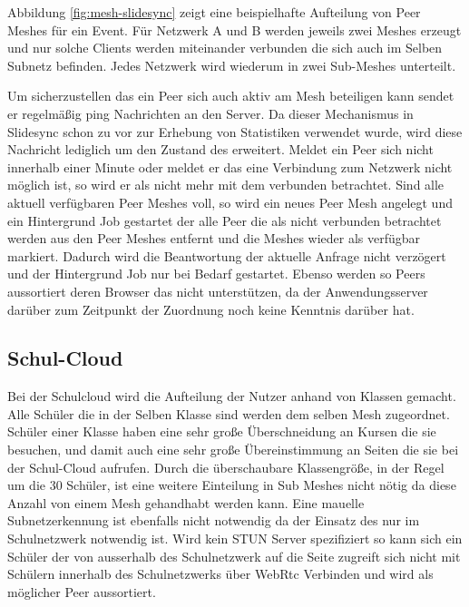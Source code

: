 Abbildung \ref{fig:mesh-slidesync} zeigt eine beispielhafte Aufteilung von Peer Meshes für ein Event. Für Netzwerk A und B werden jeweils zwei Meshes erzeugt und nur solche Clients werden miteinander verbunden die sich auch im Selben Subnetz befinden. Jedes Netzwerk wird wiederum in zwei Sub-Meshes unterteilt.

Um sicherzustellen das ein Peer sich auch aktiv am Mesh beteiligen kann sendet er regelmäßig ping Nachrichten an den Server. Da dieser Mechanismus in Slidesync schon zu vor zur Erhebung von Statistiken verwendet wurde, wird diese Nachricht lediglich um den Zustand des \cdns erweitert. Meldet ein Peer sich nicht innerhalb einer Minute oder meldet er das eine Verbindung zum \pTp Netzwerk nicht möglich ist, so wird er als nicht mehr mit dem \pTp \cdn verbunden betrachtet. Sind alle aktuell verfügbaren Peer Meshes voll, so wird ein neues Peer Mesh angelegt und ein Hintergrund Job gestartet der alle Peer die als nicht verbunden betrachtet werden aus den Peer Meshes entfernt und die Meshes wieder als verfügbar markiert. Dadurch wird die Beantwortung der aktuelle Anfrage nicht verzögert und der Hintergrund Job nur bei Bedarf gestartet. Ebenso werden so Peers aussortiert deren Browser das \pTp \cdn nicht unterstützen, da der Anwendungsserver darüber zum Zeitpunkt der Zuordnung noch keine Kenntnis darüber hat.

\subsection{Schul-Cloud}
Bei der Schulcloud wird die Aufteilung der Nutzer anhand von Klassen gemacht. Alle Schüler die in der Selben Klasse sind werden dem selben Mesh zugeordnet. Schüler einer Klasse haben eine sehr große Überschneidung an Kursen die sie besuchen, und damit auch eine sehr große Übereinstimmung an Seiten die sie bei der Schul-Cloud aufrufen. Durch die überschaubare Klassengröße, in der Regel um die 30 Schüler, ist eine weitere Einteilung in Sub Meshes nicht nötig da diese Anzahl von einem Mesh gehandhabt werden kann. Eine mauelle Subnetzerkennung ist ebenfalls nicht notwendig da der Einsatz des \pTp \cdns nur im Schulnetzwerk notwendig ist. Wird kein STUN Server spezifiziert so kann sich ein Schüler der von ausserhalb des Schulnetzwerk auf die Seite zugreift sich nicht mit Schülern innerhalb des Schulnetzwerks über WebRtc Verbinden und wird als möglicher Peer aussortiert.

